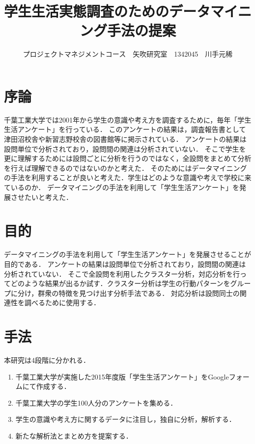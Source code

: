 \documentclass[uplatex,twocolumn,dvipdfmx]{jsarticle}
\title{\vspace{-5mm}\fontsize{14pt}{0pt}\selectfont 学生生活実態調査のためのデータマイニング手法の提案}
\author{\normalsize プロジェクトマネジメントコース　矢吹研究室　1342045　川手元稀}
\date{}
\begin{document}
\fontsize{10.5pt}{\baselineskip}\selectfont
\maketitle





\section{序論}
千葉工業大学では2001年から学生の意識や考え方を調査するために，毎年「学生生活アンケート」を行っている．
このアンケートの結果は，調査報告書として津田沼校舎や新習志野校舎の図書館等に掲示されている．\cite{a}
アンケートの結果は設問単位で分析されており，設問間の関連は分析されていない．
そこで学生を更に理解するためには設問ごとに分析を行うのではなく，全設問をまとめて分析を行えば理解できるのではないのかと考えた．
そのためにはデータマイニングの手法を利用することが良いと考えた．学生はどのような意識や考えで学校に来ているのか．
データマイニングの手法を利用して「学生生活アンケート」を発展させたいと考えた．

\section{目的}
データマイニングの手法を利用して「学生生活アンケート」を発展させることが目的である．
アンケートの結果は設問単位で分析されており，設問間の関連は分析されていない．
そこで全設問を利用したクラスター分析，対応分析を行ってどのような結果が出るか試す．クラスター分析は学生の行動パターンをグループに分け，群衆の特徴を見つけ出す分析手法である\cite{b}．
対応分析は設問同士の関連性を調べるために使用する．
\section{手法}
本研究は4段階に分かれる．
\begin{enumerate}
\item 千葉工業大学が実施した2015年度版「学生生活アンケート」をGoogleフォームにて作成する．
\item 千葉工業大学の学生100人分のアンケートを集める．
\item 学生の意識や考え方に関するデータに注目し，独自に分析，解析する．
\item 新たな解析法とまとめ方を提案する．
\end{enumerate}
\end{document}
